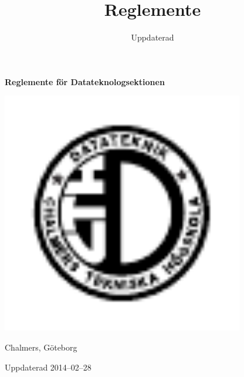 \documentclass{dtek}
\title{Reglemente}
\date{Uppdaterad \updated}
\newcommand{\updated}{2014--02--28}
\begin{document}
\makeheadfoot%

\vspace*{\fill}
\begin{center}
  {\Huge \textbf{Reglemente för Datateknologsektionen}}

  \includegraphics[width=300pt]{Datalogo.pdf}

  {\LARGE Chalmers, Göteborg}

  \vspace{2cm}

  {\LARGE Uppdaterad \updated}
\end{center}
\vfill

\newpage

\setcounter{tocdepth}{2}
\tableofcontents

\newpage

\end{document}
